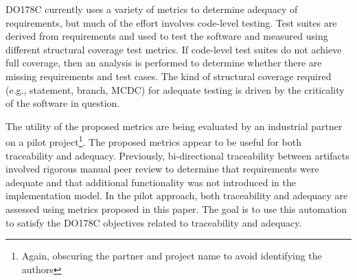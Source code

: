 DO178C currently uses a variety of metrics to determine adequacy of requirements, but much of the effort involves code-level testing.  Test suites are derived from requirements and used to test the software and measured using different structural coverage test metrics.  If code-level test suites do not achieve full coverage, then an analysis is performed to determine whether there are missing requirements and test cases.  The kind of structural coverage required (e.g., statement, branch, MCDC) for adequate testing is driven by the criticality of the software in question.

The utility of the proposed metrics are being evaluated by an industrial partner on a pilot project\footnote{Again, obscuring the partner and project name to avoid identifying the authors}.  The proposed metrics appear to be useful for both traceability and adequacy.  Previously, bi-directional traceability between artifacts involved rigorous manual peer review to determine that requirements were adequate and that additional functionality was not introduced in the implementation model.  In the pilot approach, both traceability and adequacy are assessed using metrics proposed in this paper.  The goal is to use this automation to satisfy the DO178C objectives related to traceability and adequacy.


